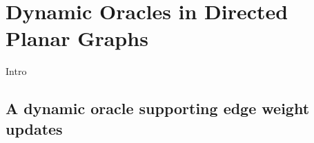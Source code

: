 \section{Dynamic Oracles in Directed Planar Graphs}\label{oracle3}
Intro

\subsection{A dynamic oracle supporting edge weight updates}
